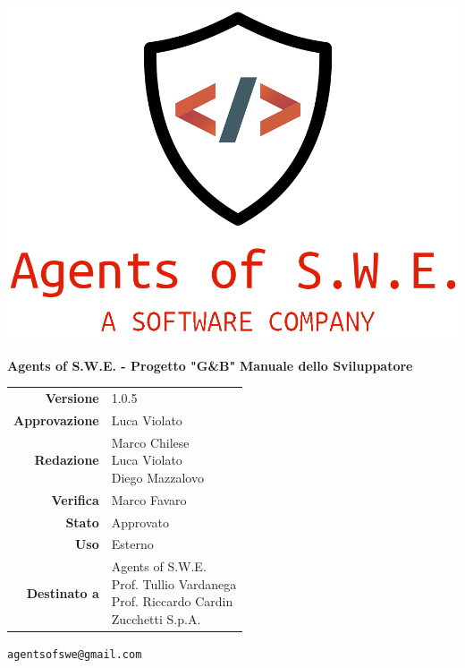 


\begin{titlepage}
\thispagestyle{empty}

\begin{center}

\includegraphics[scale=0.3]{./images/logo.png} 

\large \textbf{Agents of S.W.E. - Progetto "G\&B"}
\vfill
\Huge \textbf{Manuale dello Sviluppatore}
\vfill
\large
\renewcommand{\arraystretch}{1.3}
\begin{tabular}{r|l}
\textbf{Versione} & 1.0.5\\
\textbf{Approvazione} & Luca Violato \\
\textbf{Redazione} & \parbox[t]{5cm}{Marco Chilese\\Luca Violato\\Diego Mazzalovo}\\
\textbf{Verifica} & \parbox[t]{5cm}{Marco Favaro}\\
\textbf{Stato} & Approvato\\
\textbf{Uso} & Esterno\\
\textbf{Destinato a} & \parbox[t]{5cm}{Agents of S.W.E. \\Prof. Tullio Vardanega\\Prof. Riccardo Cardin \\ Zucchetti S.p.A.}
\end{tabular}
\vfill
\small
\texttt{agentsofswe@gmail.com}
\end{center}
\end{titlepage}

\pagebreak

